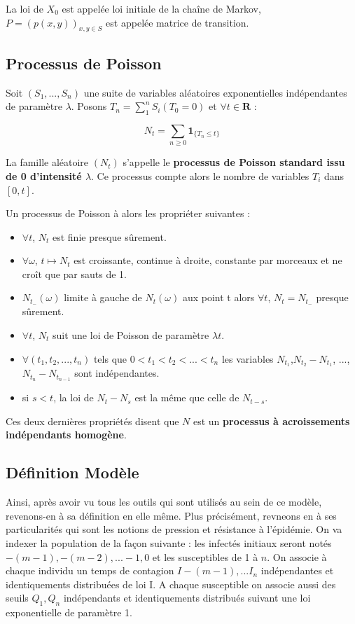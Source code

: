 La loi de $X_0$ est appelée loi initiale de la chaîne de Markov, $P = (p(x, y))_{x,y \in S}$ est appelée matrice de transition.

\subsection{Processus de Poisson}

Soit $(S_1, ..., S_n)$ une suite de variables aléatoires exponentielles indépendantes de paramètre $\lambda$. Posons $T_n = \sum^n_1 S_i (T_0 = 0)$ et $\forall t \in \boldsymbol{R}$ :

\begin{center}
    $$ N_t = \sum_{n \geq 0} \boldsymbol{1}_{\{T_n \leq t \}} $$
\end{center}

La famille aléatoire $(N_t)$ s'appelle le \textbf{processus de Poisson standard issu de 0 d'intensité $\lambda$}. Ce processus compte alors le nombre de variables $T_i$ dans $[0, t]$.

Un processus de Poisson à alors les propriéter suivantes :
\begin{itemize}
    \item $\forall t$, $N_t$ est finie presque sûrement.
    \item $\forall \omega$, $t \mapsto N_t$ est croissante, continue à droite, constante par morceaux et ne croît que par sauts de 1.
    \item $N_{t_-}(\omega)$ limite à gauche de $N_t(\omega)$ aux point t alors $\forall t$, $N_t = N_{t_-}$ presque sûrement.
    \item $\forall t$, $N_t$ suit une loi de Poisson de paramètre $\lambda t$.
    \item $\forall (t_1, t_2, ..., t_n)$ tels que $0 < t_1 < t_2 < ... < t_n$ les variables $N_{t_1}$,$N_{t_2} - N_{t_1}$, ..., $N_{t_n} - N_{t_{n-1}}$ sont indépendantes.
    \item si $s < t$, la loi de $N_t - N_s$ est la même que celle de $N_{t - s}$.
\end{itemize}

Ces deux dernières propriétés disent que $N$ est un \textbf{processus à acroissements indépendants homogène}.

\subsection{Définition Modèle}

Ainsi, après avoir vu tous les outils qui sont utilisés au sein de ce modèle, revenons-en à sa définition en elle même. Plus précisément, revneons en à ses particularités qui sont les notions de pression et résistance à l'épidémie. On va indexer la population de la façon suivante : les infectés initiaux seront notés $-(m-1), -(m-2), ...  -1, 0$ et les susceptibles de 1 à $n$. On associe à chaque individu un temps de contagion $I-(m-1), ...I_n$ indépendantes et identiquements distribuées de loi I. A chaque susceptible on associe aussi des seuils $Q_1, Q_n$ indépendants et identiquements distribués suivant une loi exponentielle de paramètre 1.

